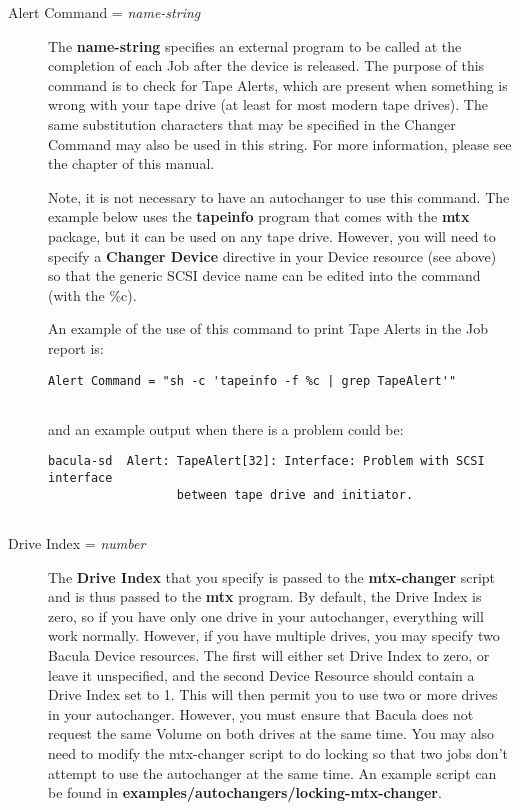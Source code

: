 \begin{description}
\item [Alert Command = {\it name-string}]
   The {\bf name-string} specifies an external program to be called  at the
completion of each Job after the device is released.  The purpose of this
command is to check for Tape Alerts, which  are present when something is
wrong with your tape drive  (at least for most modern tape drives).  The same
substitution characters that may be specified  in the Changer Command may also
be used in this string.  For more information, please see  the 
 chapter of this  manual. 


Note, it is not necessary to have an autochanger to use this  command. The
example below uses the {\bf tapeinfo} program  that comes with the {\bf mtx}
package, but it can be used  on any tape drive. However, you will need to
specify  a {\bf Changer Device} directive in your Device resource  (see above)
so that the generic SCSI device name can be  edited into the command (with the
\%c).  

An example of the use of this command to print Tape Alerts  in the Job report
is:  

\footnotesize
\begin{verbatim}
Alert Command = "sh -c 'tapeinfo -f %c | grep TapeAlert'"
      
\end{verbatim}
\normalsize

and an example output when there is a problem could be:  

\footnotesize
\begin{verbatim}
bacula-sd  Alert: TapeAlert[32]: Interface: Problem with SCSI interface
                  between tape drive and initiator.
      
\end{verbatim}
\normalsize

\item [Drive Index = {\it number}]
   The {\bf Drive Index} that you specify is passed to the  {\bf mtx-changer}
script and is thus passed to the {\bf mtx}  program. By default, the Drive
Index is zero, so if you have only  one drive in your autochanger, everything
will work normally.  However, if you have multiple drives, you may specify two
Bacula  Device resources. The first will either set Drive Index to zero,  or
leave it unspecified, and the second Device Resource should  contain a Drive
Index set to 1. This will then permit you to  use two or more drives in your
autochanger. However, you must ensure  that Bacula does not request the same
Volume on both drives  at the same time. You may also need to modify the
mtx-changer  script to do locking so that two jobs don't attempt to use  the
autochanger at the same time. An example script can  be found in {\bf
examples/autochangers/locking-mtx-changer}.  


\end{description}
